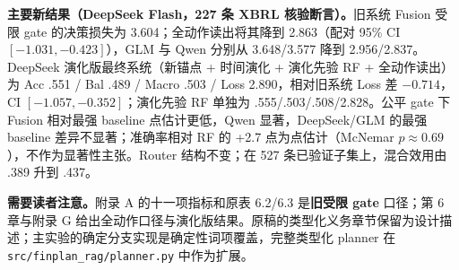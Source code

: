 \documentclass[12pt,openany]{ctexbook}
\begin{document}
\begin{revbox}
\noindent\textbf{主要新结果（DeepSeek Flash，227 条 XBRL 核验断言）。}旧系统 Fusion 受限 gate 的决策损失为 3.604；全动作读出将其降到 2.863（配对 95\% CI $[-1.031,-0.423]$），GLM 与 Qwen 分别从 3.648/3.577 降到 2.956/2.837。DeepSeek 演化版最终系统（新锚点 + 时间演化 + 演化先验 RF + 全动作读出）为 Acc .551 / Bal .489 / Macro .503 / Loss 2.890，相对旧系统 Loss 差 $-0.714$，CI $[-1.057,-0.352]$；演化先验 RF 单独为 .555/.503/.508/2.828。公平 gate 下 Fusion 相对最强 baseline 点估计更低，Qwen 显著，DeepSeek/GLM 的最强 baseline 差异不显著；准确率相对 RF 的 +2.7 点为点估计（McNemar $p\approx0.69$），不作为显著性主张。Router 结构不变；在 527 条已验证子集上，混合效用由 .389 升到 .437。
\end{revbox}

\begin{revbox}
\noindent\textbf{需要读者注意。}附录 A 的十一项指标和原表 6.2/6.3 是\textbf{旧受限 gate} 口径；第 6 章与附录 G 给出全动作口径与演化版结果。原稿的类型化义务章节保留为设计描述；主实验的确定分支实现是确定性词项覆盖，完整类型化 planner 在 \texttt{src/finplan\_rag/planner.py} 中作为扩展。
\end{revbox}
\end{document}

